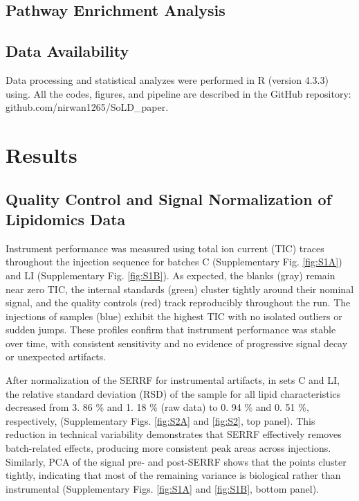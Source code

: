 \documentclass[10pt,letterpaper]{article}
\begin{document}
\subsection*{Pathway Enrichment Analysis}

\subsection*{Data Availability}
Data processing and statistical analyzes were performed in R (version 4.3.3) using. All the codes, figures, and pipeline are described in the GitHub repository: github.com/nirwan1265/SoLD\_paper.

\section*{Results}

\subsection*{Quality Control and Signal Normalization of Lipidomics Data}
Instrument performance was measured using total ion current (TIC) traces throughout the injection sequence for batches C (Supplementary Fig. \ref{fig:S1A}) and LI (Supplementary Fig. \ref{fig:S1B}). As expected, the blanks (gray) remain near zero TIC, the internal standards (green) cluster tightly around their nominal signal, and the quality controls (red) track reproducibly throughout the run. The injections of samples (blue) exhibit the highest TIC with no isolated outliers or sudden jumps. These profiles confirm that instrument performance was stable over time, with consistent sensitivity and no evidence of progressive signal decay or unexpected artifacts.

After normalization of the SERRF for instrumental artifacts, in sets C and LI, the relative standard deviation (RSD) of the sample  for all lipid characteristics decreased from 3. 86 \% and 1. 18 \% (raw data)  to 0. 94 \% and 0. 51 \%, respectively,  (Supplementary Figs. \ref{fig:S2A} and \ref{fig:S2}, top panel). This reduction in technical variability demonstrates that SERRF effectively removes batch-related effects, producing more consistent peak areas across injections. Similarly, PCA of the signal pre- and post-SERRF shows that the points cluster tightly, indicating that most of the remaining variance is biological rather than instrumental (Supplementary Figs. \ref{fig:S1A} and \ref{fig:S1B}, bottom panel).
\end{document}
